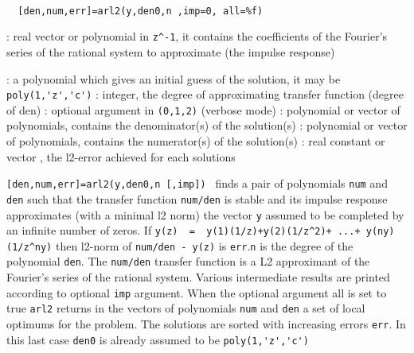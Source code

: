 \begin{mandesc}
   \\ %
\end{mandesc}
\begin{calling_sequence}
\begin{verbatim}
  [den,num,err]=arl2(y,den0,n ,imp=0, all=%f)  
\end{verbatim}
\end{calling_sequence}
\begin{parameters}
  \begin{varlist}
    : real vector or polynomial in \verb!z^-1!, it contains the
    coefficients of the Fourier's series of the rational system to approximate
    (the impulse response) 
    
    : a polynomial which gives an initial guess of the solution, it
    may be \verb!poly(1,'z','c')!
    : integer, the degree of approximating transfer function (degree of den)
    : optional argument in \verb!(0,1,2)! (verbose mode)
    : polynomial or vector of polynomials, contains the denominator(s) of the solution(s)
    : polynomial or vector of polynomials, contains the numerator(s) of the solution(s)
    : real constant or vector , the l2-error achieved for each solutions
  \end{varlist}
\end{parameters}
\begin{mandescription}
  \verb![den,num,err]=arl2(y,den0,n [,imp]) ! finds a pair of polynomials
  \verb!num! and \verb!den! such that the transfer function \verb!num/den!
  is stable and its impulse response approximates (with a minimal l2
  norm) the vector \verb!y! assumed to be completed by an infinite number of zeros.
  If \verb!y(z)  =  y(1)(1/z)+y(2)(1/z^2)+ ...+ y(ny)(1/z^ny)!
  then l2-norm of \verb!num/den - y(z)! is \verb!err!.\verb!n! is the degree of the polynomial \verb!den!.
  The \verb!num/den!  transfer function is a L2 approximant of the
  Fourier's series of the rational system.
  Various intermediate results are printed according to optional \verb!imp! argument. 
  When the optional argument all is set to true \verb!arl2! returns in the
  vectors of polynomials \verb!num! and \verb!den!  a set of local
  optimums for the problem. The solutions are sorted with increasing
  errors \verb!err!. In this last case \verb!den0! is already assumed to be 
  \verb!poly(1,'z','c')!
\end{mandescription}
